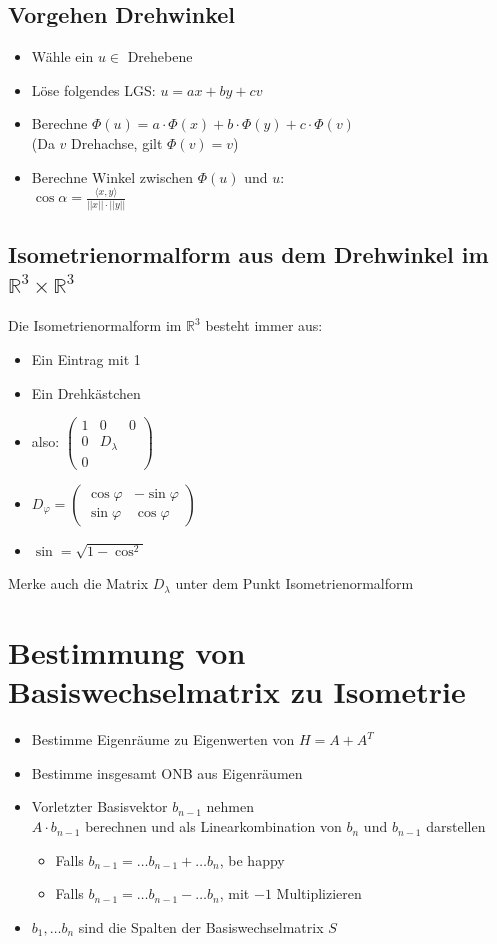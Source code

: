 \documentclass[a4paper,portrait]{scrartcl}
\begin{document}
\subsection{Vorgehen Drehwinkel}
\begin{itemize}
	\item Wähle ein $u \in $ Drehebene
	\item Löse folgendes LGS: $u=ax+by+cv$
	\item Berechne $\Phi(u) = a \cdot \Phi(x) + b \cdot \Phi(y)+ c \cdot \Phi(v)$ \\
		(Da $v$ Drehachse, gilt $\Phi(v) = v$)
	\item Berechne Winkel zwischen $\Phi(u)$ und $u$:\\
		$\cos \alpha = \frac{\langle x,y\rangle}{||x|| \cdot ||y||}$
\end{itemize}
\subsection{Isometrienormalform aus dem Drehwinkel im $\mathbb{R}^3\times\mathbb{R}^3$}
Die Isometrienormalform im $\mathbb{R}^3$ besteht immer aus:
\begin{itemize}
	\item Ein Eintrag mit 1
	\item Ein Drehkästchen
	\item also: $\begin{pmatrix}
1&0&0 \\
0&D_\lambda&\\
0&&
\end{pmatrix}$
	\item $D_\varphi = \begin{pmatrix}
\cos \varphi & -\sin \varphi \\
\sin \varphi & \cos \varphi
\end{pmatrix}$
	\item $\sin = \sqrt{1-\cos^2}$
\end{itemize}
Merke auch die Matrix $D_\lambda$ unter dem Punkt Isometrienormalform
\section{Bestimmung von Basiswechselmatrix zu Isometrie}
\begin{itemize}
	\item Bestimme Eigenräume zu Eigenwerten von $H=A+A^T$
	\item Bestimme insgesamt ONB aus Eigenräumen
	\item Vorletzter Basisvektor $b_{n-1}$ nehmen \\
		$A\cdot b_{n-1}$ berechnen und als Linearkombination von $b_{n} \text{ und } b_{n-1}$ darstellen
	\begin{itemize}
		\item Falls $b_{n-1} = \hdots b_{n-1} + \hdots b_{n}$, be happy
		\item Falls $b_{n-1} = \hdots b_{n-1} - \hdots b_{n}$, mit $-1$ Multiplizieren
	\end{itemize}
	\item $b_1, \hdots b_n$ sind die Spalten der Basiswechselmatrix $S$
\end{itemize}
\end{document}
